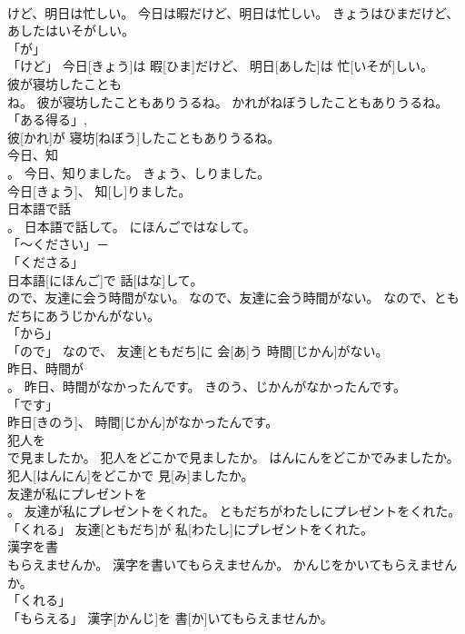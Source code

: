 \documentclass[8pt]{extreport}
\begin{document}
\begin{CJK}{UTF8}{min}
\\	けど、明日は忙しい。	今日は暇だけど、明日は忙しい。	きょうはひまだけど、あしたはいそがしい。	
\\	「が」 
\\	「けど」	今日[きょう]は 暇[ひま]だけど、 明日[あした]は 忙[いそが]しい。		
\\	彼が寝坊したことも
\\	ね。	彼が寝坊したこともありうるね。	かれがねぼうしたこともありうるね。	
\\	「ある得る」, 
\\	彼[かれ]が 寝坊[ねぼう]したこともありうるね。		
\\	今日、知
\\	。	今日、知りました。	きょう、しりました。	
\\	今日[きょう]、 知[し]りました。		
\\	日本語で話
\\	。	日本語で話して。	にほんごではなして。	
\\	「～ください」－ 
\\	「くださる」　
\\	日本語[にほんご]で 話[はな]して。		
\\	ので、友達に会う時間がない。	なので、友達に会う時間がない。	なので、ともだちにあうじかんがない。	
\\	「から」 
\\	「ので」	なので、 友達[ともだち]に 会[あ]う 時間[じかん]がない。		
\\	昨日、時間が
\\	。	昨日、時間がなかったんです。	きのう、じかんがなかったんです。	
\\	「です」 
\\	昨日[きのう]、 時間[じかん]がなかったんです。		
\\	犯人を
\\	で見ましたか。	犯人をどこかで見ましたか。	はんにんをどこかでみましたか。	
\\	犯人[はんにん]をどこかで 見[み]ましたか。		
\\	友達が私にプレゼントを
\\	。	友達が私にプレゼントをくれた。	ともだちがわたしにプレゼントをくれた。	
\\	「くれる」	友達[ともだち]が 私[わたし]にプレゼントをくれた。		
\\	漢字を書
\\	もらえませんか。	漢字を書いてもらえませんか。	かんじをかいてもらえませんか。	
\\	「くれる」 
\\	「もらえる」	漢字[かんじ]を 書[か]いてもらえませんか。		

\end{CJK}
\end{document}
